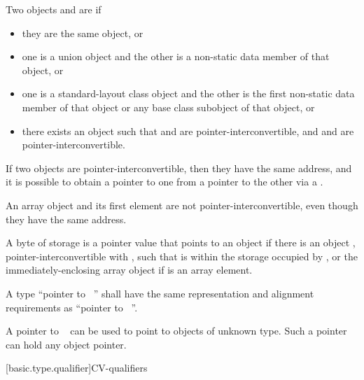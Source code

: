 \pnum
Two objects  and  are  if
\begin{itemize}
\item
they are the same object, or
\item
one is a union object and
the other is a non-static data member of that object, or
\item
one is a standard-layout class object and
the other is the first non-static data member of that object or
any base class subobject of that object, or
\item
there exists an object  such that
 and  are pointer-interconvertible, and
 and  are pointer-interconvertible.
\end{itemize}
If two objects are pointer-interconvertible,
then they have the same address,
and it is possible to obtain a pointer to one
from a pointer to the other
via a .
\begin{note}
An array object and its first element are not pointer-interconvertible,
even though they have the same address.
\end{note}

\pnum
A byte of storage 
is 
a pointer value that points to an object 
if there is an object ,
pointer-interconvertible with ,
such that  is within the storage occupied by
, or the immediately-enclosing array object
if  is an array element.

\pnum
{}%
%
A type ``pointer to \cv{}~''
shall have the same representation and alignment
requirements as ``pointer to \cv{}~''.
\begin{note}
A pointer to \cv{}~
can be used to point to objects of
unknown type. Such a pointer can hold any object pointer.
\end{note}

[basic.type.qualifier]{CV-qualifiers}

